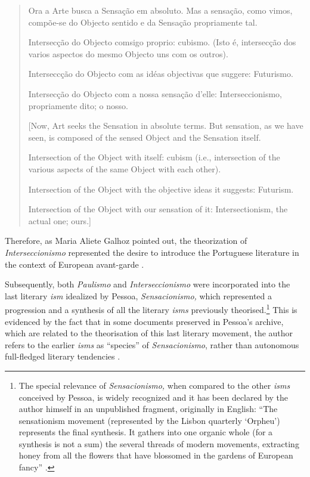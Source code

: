 \begin{paper}
\begin{quote}
Ora a Arte busca a Sensação em absoluto. Mas a sensação, como vimos,
compõe-se do Objecto sentido e da Sensação propriamente tal.

Intersecção do Objecto comsigo proprio: cubismo. (Isto é, intersecção dos
varios aspectos do mesmo Objecto uns com os outros).

Interseccção do Objecto com as idéas objectivas que suggere: Futurismo.

Intersecção do Objecto com a nossa sensação d'elle: Interseccionismo,
propriamente dito; o nosso.

\vspace{1em}

[Now, Art seeks the Sensation in absolute terms. But sensation, as we
have seen, is composed of the sensed Object and the Sensation itself.

Intersection of the Object with itself: cubism (i.e., intersection of
the various aspects of the same Object with each other).

Intersection of the Object with the objective ideas it suggests:
Futurism.

Intersection of the Object with our sensation of it: Intersectionism,
the actual one; ours.]  

\begin{flushright}
    \parencite[122]{pessoa_sensacionismo_2009}
\end{flushright}
\end{quote}


\noindent Therefore, as Maria Aliete Galhoz pointed out, the theorization of
\emph{Interseccionismo} represented the desire to introduce the
Portuguese literature in the context of European avant-garde \parencite[XLI]{galhoz_o_1980}.

Subsequently, both \emph{Paulismo} and \emph{Interseccionismo} were
incorporated into the last literary \emph{ism} idealized by Pessoa,
\emph{Sensacionismo,} which represented a progression and a synthesis of
all the literary \emph{isms} previously theorised.\footnote{The special
  relevance of \emph{Sensacionismo,} when compared to the other
  \emph{isms} conceived by Pessoa, is widely recognized and it has been
  declared by the author himself in an unpublished fragment, originally
  in English: ``The sensationism movement (represented by the Lisbon
  quarterly `Orpheu') represents the final synthesis. It gathers into
  one organic whole (for a synthesis is not a sum) the several threads
  of modern movements, extracting honey from all the flowers that have
  blossomed in the gardens of European fancy'' \parencite[159]{pessoa_sensacionismo_2009}.} This
is evidenced by the fact that in some documents preserved in Pessoa's
archive, which are related to the theorisation of this last literary
movement, the author refers to the earlier \emph{isms} as ``species'' of
\emph{Sensacionismo}, rather than autonomous full-fledged literary
tendencies \parencite[149]{pessoa_sensacionismo_2009}.


\end{paper}
